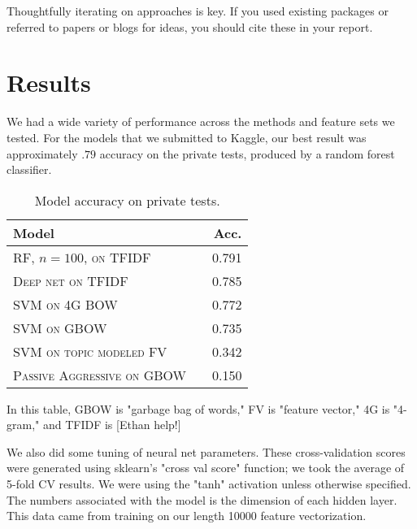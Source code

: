 \documentclass[11pt]{article}
\begin{document}
  \noindent Thoughtfully iterating on approaches is key.
  If you used existing packages or referred to papers or blogs for ideas,
  you should cite these in your report. 



\section{Results}
We had a wide variety of performance across the methods and feature sets we tested. For the models that we submitted to Kaggle, our best result was approximately $.79$ accuracy on the private tests, produced by a random forest classifier.
 \\
\begin{table}
\centering
\begin{tabular}{llr}
	\toprule
	Model &  & Acc. \\
	\midrule
	\textsc{RF, $n=100$, on TFIDF} & & 0.791\\
	\textsc{Deep net on TFIDF} & & 0.785\\
	\textsc{SVM on 4G BOW} & & 0.772 \\
	\textsc{SVM on GBOW} & & 0.735  \\
	\textsc{SVM on topic modeled FV} & & 0.342 \\
	\textsc{Passive Aggressive on GBOW} & & 0.150\\
	\bottomrule
\end{tabular}
\caption{Model accuracy on private tests.}
\end{table}

In this table, GBOW is "garbage bag of words," FV is "feature vector," 4G is "4-gram," and TFIDF is [Ethan help!]

We also did some tuning of neural net parameters. These cross-validation scores were generated using sklearn's "cross val score" function; we took the average of 5-fold CV results. We were using the "tanh" activation unless otherwise specified. The numbers associated with the model is the dimension of each hidden layer. This data came from training on our length 10000 feature vectorization.
\end{document}

